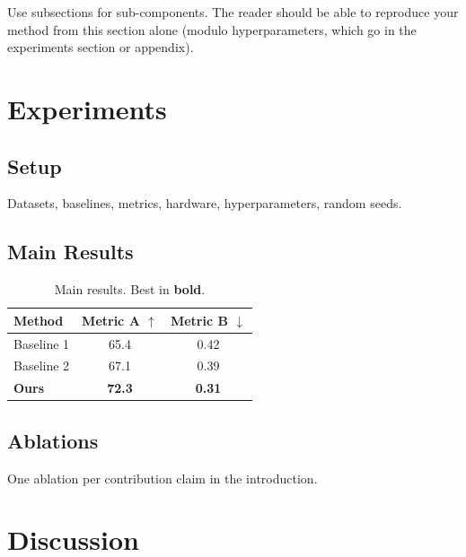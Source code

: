 \documentclass{article}
\begin{document}
Use subsections for sub-components. The reader should be able to reproduce
your method from this section alone (modulo hyperparameters, which go in
the experiments section or appendix).

\section{Experiments}
\label{sec:exp}

\subsection{Setup}
Datasets, baselines, metrics, hardware, hyperparameters, random seeds.

\subsection{Main Results}
\begin{table}[t]
\centering
\caption{Main results. Best in \textbf{bold}.}
\label{tab:main}
\begin{tabular}{lcc}
\toprule
Method & Metric A $\uparrow$ & Metric B $\downarrow$ \\
\midrule
Baseline 1 & 65.4 & 0.42 \\
Baseline 2 & 67.1 & 0.39 \\
\textbf{Ours} & \textbf{72.3} & \textbf{0.31} \\
\bottomrule
\end{tabular}
\end{table}

\subsection{Ablations}
One ablation per contribution claim in the introduction.


\section{Discussion}
\label{sec:discussion}
\end{document}
